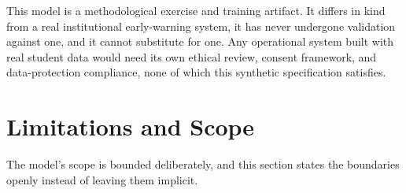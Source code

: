 \documentclass[11pt]{article}
\begin{document}
\hspace*{\parindent}This model is a methodological exercise and training artifact. It differs in kind from a real institutional early-warning system, it has never undergone validation against one, and it cannot substitute for one. Any operational system built with real student data would need its own ethical review, consent framework, and data-protection compliance, none of which this synthetic specification satisfies.

\FloatBarrier
\section{Limitations and Scope}
\label{sec:limitations}

\hspace*{\parindent}The model's scope is bounded deliberately, and this section states the boundaries openly instead of leaving them implicit.
\end{document}
